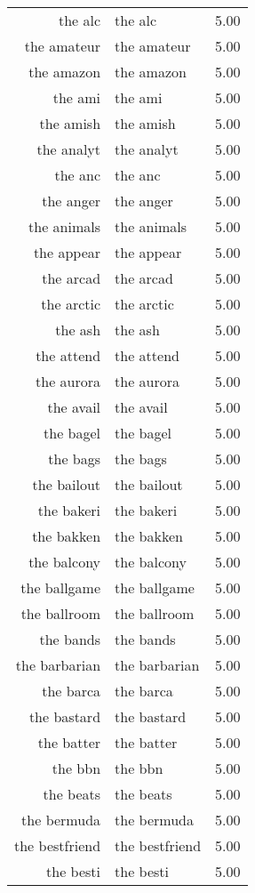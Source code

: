 \begin{table}[ht]
\begin{tabular}{rlr}
  the alc & the alc & 5.00 \\ 
  the amateur & the amateur & 5.00 \\ 
  the amazon & the amazon & 5.00 \\ 
  the ami & the ami & 5.00 \\ 
  the amish & the amish & 5.00 \\ 
  the analyt & the analyt & 5.00 \\ 
  the anc & the anc & 5.00 \\ 
  the anger & the anger & 5.00 \\ 
  the animals & the animals & 5.00 \\ 
  the appear & the appear & 5.00 \\ 
  the arcad & the arcad & 5.00 \\ 
  the arctic & the arctic & 5.00 \\ 
  the ash & the ash & 5.00 \\ 
  the attend & the attend & 5.00 \\ 
  the aurora & the aurora & 5.00 \\ 
  the avail & the avail & 5.00 \\ 
  the bagel & the bagel & 5.00 \\ 
  the bags & the bags & 5.00 \\ 
  the bailout & the bailout & 5.00 \\ 
  the bakeri & the bakeri & 5.00 \\ 
  the bakken & the bakken & 5.00 \\ 
  the balcony & the balcony & 5.00 \\ 
  the ballgame & the ballgame & 5.00 \\ 
  the ballroom & the ballroom & 5.00 \\ 
  the bands & the bands & 5.00 \\ 
  the barbarian & the barbarian & 5.00 \\ 
  the barca & the barca & 5.00 \\ 
  the bastard & the bastard & 5.00 \\ 
  the batter & the batter & 5.00 \\ 
  the bbn & the bbn & 5.00 \\ 
  the beats & the beats & 5.00 \\ 
  the bermuda & the bermuda & 5.00 \\ 
  the bestfriend & the bestfriend & 5.00 \\ 
  the besti & the besti & 5.00 \\ 

\end{tabular}
\end{table}
